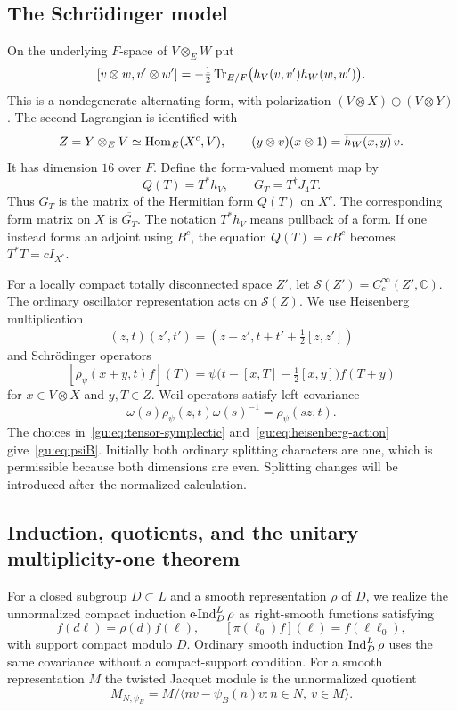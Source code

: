 \subsection{The Schr\"odinger model}
On the underlying $F$-space of $V\otimes_EW$ put
\begin{equation}\label{gu:eq:tensor-symplectic}
 [v\otimes w,v'\otimes w']
 =-\tfrac12\operatorname{Tr}_{E/F}\bigl(h_V(v,v')h_W(w,w')\bigr).
\end{equation}
This is a nondegenerate alternating form, with polarization $(V\otimes X)\oplus(V\otimes Y)$. The second Lagrangian is identified with
\begin{equation}\label{gu:eq:schrodinger-Z}
 Z=Y\otimes_EV\simeq\operatorname{Hom}_E(X^c,V),
 \qquad
 (y\otimes v)(x\otimes1)=\overline{h_W(x,y)}\,v.
\end{equation}
It has dimension $16$ over $F$. Define the form-valued moment map by
\begin{equation}\label{gu:eq:moment-map}
 Q(T)=T^*h_V,\qquad G_T=T^\dagger J_4T.
\end{equation}
Thus $G_T$ is the matrix of the Hermitian form $Q(T)$ on $X^c$. The corresponding form matrix on $X$ is $\overline{G_T}$. The notation $T^*h_V$ means pullback of a form. If one instead forms an adjoint using $B^c$, the equation $Q(T)=cB^c$ becomes $T^*T=cI_{X^c}$.

For a locally compact totally disconnected space $Z'$, let $\mathcal S(Z')=C_c^\infty(Z',\mathbb C)$. The ordinary oscillator representation acts on $\mathcal S(Z)$. We use Heisenberg multiplication
\[
 (z,t)(z',t')=(z+z',t+t'+\tfrac12[z,z'])
\]
and Schr\"odinger operators
\begin{equation}\label{gu:eq:heisenberg-action}
 [\rho_\psi(x+y,t)f](T)
 =\psi\bigl(t-[x,T]-\tfrac12[x,y]\bigr)f(T+y)
\end{equation}
for $x\in V\otimes X$ and $y,T\in Z$. Weil operators satisfy left covariance
\[
 \omega(s)\rho_\psi(z,t)\omega(s)^{-1}=\rho_\psi(sz,t).
\]
The choices in~\eqref{gu:eq:tensor-symplectic} and~\eqref{gu:eq:heisenberg-action} give~\eqref{gu:eq:psiB}. Initially both ordinary splitting characters are one, which is permissible because both dimensions are even. Splitting changes will be introduced after the normalized calculation.

\subsection{Induction, quotients, and the unitary multiplicity-one theorem}
For a closed subgroup $D\subset L$ and a smooth representation $\rho$ of $D$, we realize the unnormalized compact induction $\operatorname{c\!-Ind}_D^L\rho$ as right-smooth functions satisfying
\[
 f(d\ell)=\rho(d)f(\ell),\qquad
 [\pi(\ell_0)f](\ell)=f(\ell\ell_0),
\]
with support compact modulo $D$. Ordinary smooth induction $\operatorname{Ind}_D^L\rho$ uses the same covariance without a compact-support condition. For a smooth representation $M$ the twisted Jacquet module is the unnormalized quotient
\[
 M_{N,\psi_B}
 =M/\langle nv-\psi_B(n)v:n\in N,\ v\in M\rangle.
\]

